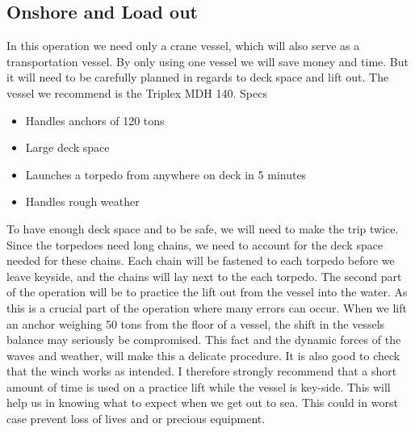 \documentclass[DIV=calc, paper=a4, fontsize=13pt, twocolumn]{scrartcl}	 %
\begin{document}
\subsection*{Onshore and Load out}
In this operation we need only a crane vessel, which will also serve as a transportation vessel. By only using one vessel we will save money and time. But it will need to be carefully planned in regards to deck space and lift out. The vessel we recommend is the Triplex MDH 140. Specs
\begin{itemize}
\item Handles anchors of 120 tons
\item Large deck space 
\item Launches a torpedo from anywhere on deck in 5 minutes
\item Handles rough weather
\end{itemize}
To have enough deck space and to be safe, we will need to make the trip twice. Since the torpedoes need long chains, we need to account for the deck space needed for these chains. Each chain will be fastened to each torpedo before we leave keyside, and the chains will lay next to the each torpedo.
\newline
The second part of the operation will be to practice the lift out from the vessel into the water. As this is a crucial part of the operation where many errors can occur. When we lift an anchor weighing 50 tons from the floor of a vessel, the shift in the vessels balance may seriously be compromised. This fact and the dynamic forces of the waves and weather, will make this a delicate procedure. It is also good to check that the winch works as intended. 
\newline
I therefore strongly recommend that a short amount of time is used on a practice lift while the vessel is key-side. This will help us in knowing what to expect when we get out to sea. This could in worst case prevent loss of lives and or precious equipment.
\end{document}
